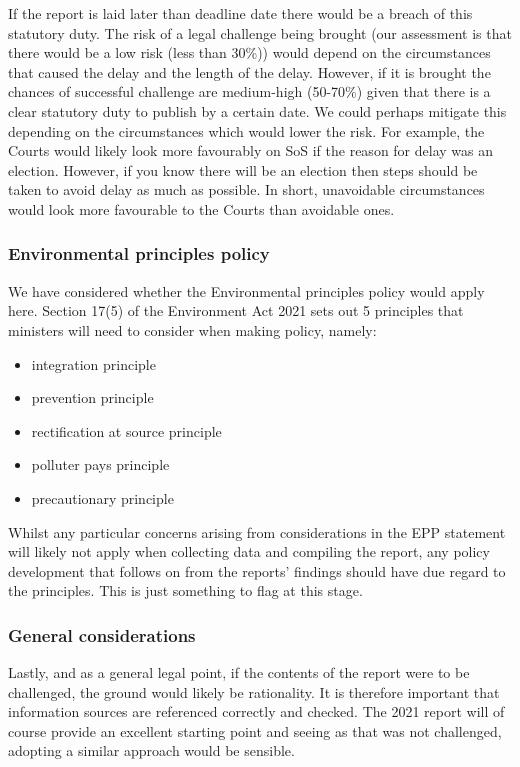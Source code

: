 \documentclass[
]{book}
\providecommand{\tightlist}{%
  \setlength{\itemsep}{0pt}\setlength{\parskip}{0pt}}
\begin{document}
If the report is laid later than deadline date there would be a breach of this
statutory duty. The risk of a legal challenge being brought (our assessment is
that there would be a low risk (less than 30\%)) would depend on the
circumstances that caused the delay and the length of the delay. However, if it
is brought the chances of successful challenge are medium-high (50-70\%) given
that there is a clear statutory duty to publish by a certain date. We could
perhaps mitigate this depending on the circumstances which would lower the risk.
For example, the Courts would likely look more favourably on SoS if the reason
for delay was an election. However, if you know there will be an election then
steps should be taken to avoid delay as much as possible. In short, unavoidable
circumstances would look more favourable to the Courts than avoidable ones.

\hypertarget{environmental-principles-policy}{%
\subsubsection{Environmental principles policy}\label{environmental-principles-policy}}

We have considered whether the Environmental principles policy would apply here. Section 17(5) of the Environment Act 2021 sets out 5 principles that ministers will need to consider when making policy, namely:

\begin{itemize}
\tightlist
\item
  integration principle
\item
  prevention principle
\item
  rectification at source principle
\item
  polluter pays principle
\item
  precautionary principle
\end{itemize}

Whilst any particular concerns arising from considerations in the EPP statement will likely not apply when collecting data and compiling the report, any policy development that follows on from the reports' findings should have due regard to the principles. This is just something to flag at this stage.

\hypertarget{general-considerations}{%
\subsubsection{General considerations}\label{general-considerations}}

Lastly, and as a general legal point, if the contents of the report were to be challenged, the ground would likely be rationality. It is therefore important that information sources are referenced correctly and checked. The 2021 report will of course provide an excellent starting point and seeing as that was not challenged, adopting a similar approach would be sensible.

  
\end{document}
